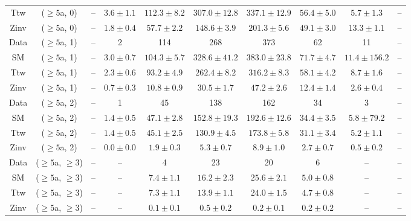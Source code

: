\begin{table}[h!]
{\begin{tabular}{cccccccccc}
	Ttw & ($\ge5$a, 0) & -- & $3.6\pm 1.1$ & $112.3\pm 8.2$ & $307.0\pm 12.8$ & $337.1\pm 12.9$ & $56.4\pm 5.0$ & $5.7\pm 1.3$ & -- \\[0.5ex] 
	Zinv & ($\ge5$a, 0) & -- & $1.8\pm 0.4$ & $57.7\pm 2.2$ & $148.6\pm 3.9$ & $201.3\pm 5.6$ & $49.1\pm 3.0$ & $13.3\pm 1.1$ & -- \\[0.5ex] 
	Data & ($\ge5$a, 1) & -- & 2 & 114 & 268 & 373 & 62 & 11 & -- \\[0.5ex] 
	SM & ($\ge5$a, 1) & -- & $3.0\pm 0.7$ & $104.3\pm 5.7$ & $328.6\pm 41.2$ & $383.0\pm 23.8$ & $71.7\pm 4.7$ & $11.4\pm 156.2$ & -- \\[0.5ex] 
	Ttw & ($\ge5$a, 1) & -- & $2.3\pm 0.6$ & $93.2\pm 4.9$ & $262.4\pm 8.2$ & $316.2\pm 8.3$ & $58.1\pm 4.2$ & $8.7\pm 1.6$ & -- \\[0.5ex] 
	Zinv & ($\ge5$a, 1) & -- & $0.7\pm 0.3$ & $10.8\pm 0.9$ & $30.5\pm 1.7$ & $47.2\pm 2.6$ & $12.4\pm 1.4$ & $2.6\pm 0.4$ & -- \\[0.5ex] 
	Data & ($\ge5$a, 2) & -- & 1 & 45 & 138 & 162 & 34 & 3 & -- \\[0.5ex] 
	SM & ($\ge5$a, 2) & -- & $1.4\pm 0.5$ & $47.1\pm 2.8$ & $152.8\pm 19.3$ & $192.6\pm 12.6$ & $34.4\pm 3.5$ & $5.8\pm 79.2$ & -- \\[0.5ex] 
	Ttw & ($\ge5$a, 2) & -- & $1.4\pm 0.5$ & $45.1\pm 2.5$ & $130.9\pm 4.5$ & $173.8\pm 5.8$ & $31.1\pm 3.4$ & $5.2\pm 1.1$ & -- \\[0.5ex] 
	Zinv & ($\ge5$a, 2) & -- & $0.0\pm 0.0$ & $1.9\pm 0.3$ & $5.3\pm 0.7$ & $8.9\pm 1.0$ & $2.7\pm 0.7$ & $0.5\pm 0.2$ & -- \\[0.5ex] 
	Data & ($\ge5$a, $\ge3$) & -- & -- & 4 & 23 & 20 & 6 & -- & -- \\[0.5ex] 
	SM & ($\ge5$a, $\ge3$) & -- & -- & $7.4\pm 1.1$ & $16.2\pm 2.3$ & $25.6\pm 2.1$ & $5.0\pm 0.8$ & -- & -- \\[0.5ex] 
	Ttw & ($\ge5$a, $\ge3$) & -- & -- & $7.3\pm 1.1$ & $13.9\pm 1.1$ & $24.0\pm 1.5$ & $4.7\pm 0.8$ & -- & -- \\[0.5ex] 
	Zinv & ($\ge5$a, $\ge3$) & -- & -- & $0.1\pm 0.1$ & $0.5\pm 0.2$ & $0.2\pm 0.1$ & $0.2\pm 0.2$ & -- & -- \\[0.5ex] 
	\hline
	\hline
\end{tabular}}
\end{table}
